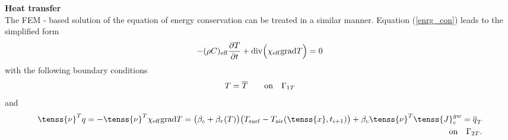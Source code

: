 {\bf Heat transfer}\\

The FEM - based solution of the equation of energy conservation can be treated in a similar manner. 
Equation (\ref{enrg_con}) leads to the simplified form
\begin{eqnarray}
- (\rho C)_{\rm eff} \frac{\partial T}{\partial t}  + 
{\rm div} \Big(\chi_{\rm eff} {\rm grad} T\Big) = 0
\end{eqnarray}
with the following boundary conditions
\begin{eqnarray}
T = \overline{T} \qquad {\rm on} \quad \Gamma_{1 T}\nonumber
\end{eqnarray}
and
\begin{eqnarray}
\tenss{\nu}^T q = - \tenss{\nu}^T \chi_{\rm eff} {\rm grad} T =
\big(\beta_c + \beta_r(T)\big) \big(T_{\rm surf}
- T_{\rm air}(\tenss{x},t_{i+1}) \big) + \beta_c \tenss{\nu}^T 
\tenss{J}_c^{gw} = \overline{q}_{T}\nonumber\\ {\rm on} \quad \Gamma_{2 T}.
\end{eqnarray}
	
